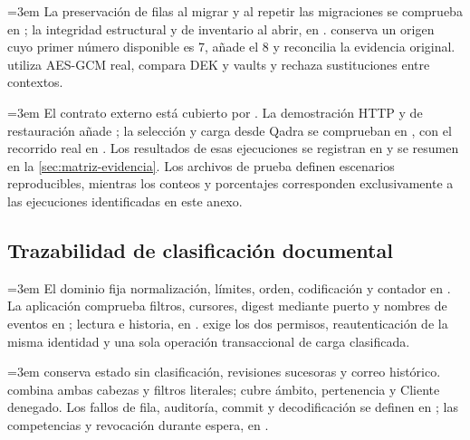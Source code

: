 {\emergencystretch=3em La preservación de filas al migrar y al repetir las migraciones se comprueba en ; la integridad estructural y de inventario al abrir, en .  conserva un origen cuyo primer número disponible es 7, añade el 8 y reconcilia la evidencia original.  utiliza AES-GCM real, compara DEK y vaults y rechaza sustituciones entre contextos.\par}

{\emergencystretch=3em El contrato externo está cubierto por . La demostración HTTP y de restauración añade ; la selección y carga desde Qadra se comprueban en , con el recorrido real en . Los resultados de esas ejecuciones se registran en  y se resumen en la \cref{sec:matriz-evidencia}. Los archivos de prueba definen escenarios reproducibles, mientras los conteos y porcentajes corresponden exclusivamente a las ejecuciones identificadas en este anexo.\par}

\subsection{Trazabilidad de clasificación documental}\label{sec:matriz-clasificacion}

{\emergencystretch=3em El dominio fija normalización, límites, orden, codificación y contador en . La aplicación comprueba filtros, cursores, digest mediante puerto y nombres de eventos en ; lectura e historia, en .  exige los dos permisos, reautenticación de la misma identidad y una sola operación transaccional de carga clasificada.\par}

{\emergencystretch=3em  conserva estado sin clasificación, revisiones sucesoras y correo histórico.  combina ambas cabezas y filtros literales;  cubre ámbito, pertenencia y Cliente denegado. Los fallos de fila, auditoría, commit y decodificación se definen en ; las competencias y revocación durante espera, en .\par}

